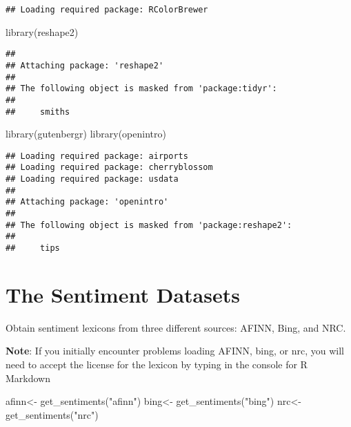\documentclass[
]{article}
\newenvironment{Shaded}{\begin{snugshade}}{\end{snugshade}}
\newcommand{\FunctionTok}[1]{\textcolor[rgb]{0.00,0.00,0.00}{#1}}
\newcommand{\NormalTok}[1]{#1}
\newcommand{\OtherTok}[1]{\textcolor[rgb]{0.56,0.35,0.01}{#1}}
\newcommand{\StringTok}[1]{\textcolor[rgb]{0.31,0.60,0.02}{#1}}
\begin{document}
\begin{verbatim}
## Loading required package: RColorBrewer
\end{verbatim}

\begin{Shaded}
\begin{Highlighting}[]
\FunctionTok{library}\NormalTok{(reshape2)}
\end{Highlighting}
\end{Shaded}

\begin{verbatim}
## 
## Attaching package: 'reshape2'
## 
## The following object is masked from 'package:tidyr':
## 
##     smiths
\end{verbatim}

\begin{Shaded}
\begin{Highlighting}[]
\FunctionTok{library}\NormalTok{(gutenbergr)}
\FunctionTok{library}\NormalTok{(openintro)}
\end{Highlighting}
\end{Shaded}

\begin{verbatim}
## Loading required package: airports
## Loading required package: cherryblossom
## Loading required package: usdata
## 
## Attaching package: 'openintro'
## 
## The following object is masked from 'package:reshape2':
## 
##     tips
\end{verbatim}

\hypertarget{the-sentiment-datasets}{%
\section{The Sentiment Datasets}\label{the-sentiment-datasets}}

Obtain sentiment lexicons from three different sources: AFINN, Bing, and
NRC.

\textbf{Note}: If you initially encounter problems loading AFINN, bing,
or nrc, you will need to accept the license for the lexicon by typing in
the console for R Markdown

\begin{Shaded}
\begin{Highlighting}[]
\NormalTok{afinn}\OtherTok{\textless{}{-}} \FunctionTok{get\_sentiments}\NormalTok{(}\StringTok{"afinn"}\NormalTok{)}
\NormalTok{bing}\OtherTok{\textless{}{-}} \FunctionTok{get\_sentiments}\NormalTok{(}\StringTok{"bing"}\NormalTok{)}
\NormalTok{nrc}\OtherTok{\textless{}{-}}\FunctionTok{get\_sentiments}\NormalTok{(}\StringTok{"nrc"}\NormalTok{)}
\end{Highlighting}
\end{Shaded}
\end{document}
